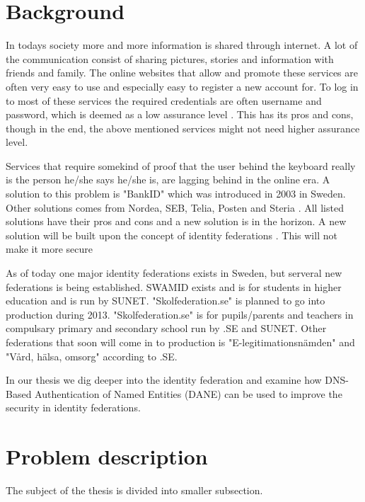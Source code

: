 \section{Background}
In todays society more and more information is shared through internet.
A lot of the communication consist of sharing pictures, stories and information with friends and family.
The online websites that allow and promote these services are often very easy to use and especially easy to register a new account for.
To log in to most of these services the required credentials are often username and password, which is deemed as a low assurance level \cite[p.~244]{pdf:SOU}.
This has its pros and cons, though in the end, the above mentioned services might not need higher assurance level.

Services that require somekind of proof that the user behind the keyboard really is the person he/she says he/she is, are lagging behind in the online era.
A solution to this problem is "BankID" which was introduced in 2003 \cite{website:bankid-about} in Sweden.
Other solutions comes from Nordea, SEB, Telia, Posten and Steria \cite[p.~256]{pdf:SOU}.
All listed solutions have their pros and cons and a new solution is in the horizon.
A new solution will be built upon the concept of identity federations \cite[p.~23]{pdf:SOU}.
This will not make it more secure

As of today one major identity federations exists in Sweden, but serveral new federations is being established.
SWAMID exists and is for students in higher education and is run by SUNET. 
"Skolfederation.se" is planned to go into production during 2013.
"Skolfederation.se" is for pupils/parents and teachers in compulsary primary and secondary school run by .SE and SUNET. 
Other federations that soon will come in to production is "E-legitimationsn{\"a}mden" and "V\r{a}rd, h{\"a}lsa, omsorg" according to .SE.



In our thesis we dig deeper into the identity federation and examine how DNS-Based Authentication of Named Entities (DANE) 
\cite{rfc:6394,rfc:draft-dane,rfc:draft-smime} can be used to improve the security in identity federations.

\section{Problem description}
The subject of the thesis is divided into smaller subsection. 

